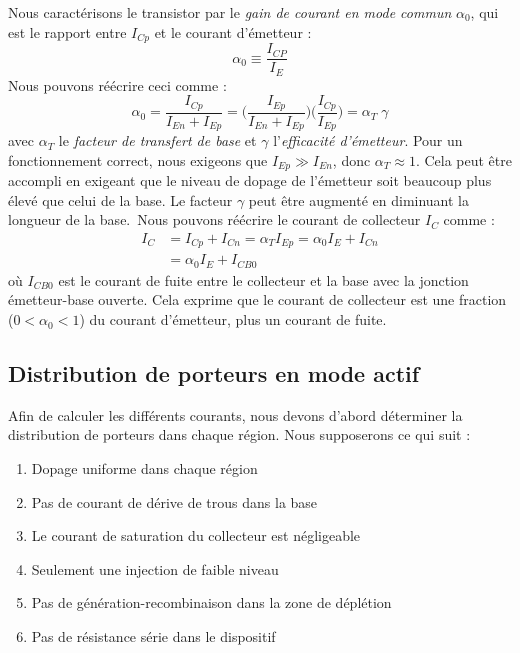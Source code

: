 Nous caractérisons le transistor par le \emph{gain de courant en mode commun} $\alpha_0$, qui est le rapport entre $I_{Cp}$ et le courant d'émetteur :
$$
\alpha_0 \equiv \frac{I_{CP}}{I_E}
$$
Nous pouvons réécrire ceci comme :
$$
\alpha_0 = \frac{I_{Cp}}{I_{En} + I_{Ep}} = \Big(\frac{I_{Ep}}{I_{En} + I_{Ep}}\Big)  \Big(\frac{I_{Cp}}{I_{Ep}}\Big) = \alpha_T \; \gamma
$$
avec $\alpha_T$ le \emph{facteur de transfert de base} et $\gamma$ l'\emph{efficacité d'émetteur}. Pour un fonctionnement correct, nous exigeons que $I_{Ep} \gg I_{En}$, donc $\alpha_T \approx 1$. Cela peut être accompli en exigeant que le niveau de dopage de l'émetteur soit beaucoup plus élevé que celui de la base. Le facteur $\gamma$ peut être augmenté en diminuant la longueur de la base.\
Nous pouvons réécrire le courant de collecteur $I_C$ comme :
\begin{equation}
	\begin{split}
		I_C &= I_{Cp} + I_{Cn} = \alpha_T I_{Ep} = \alpha_0 I_E + I_{Cn} \\
		&= \alpha_0 I_E + I_{CB0}
	\end{split}
	\label{eq:bjt1}
\end{equation}
où $I_{CB0}$ est le courant de fuite entre le collecteur et la base avec la jonction émetteur-base ouverte. Cela exprime que le courant de collecteur est une fraction ($0 < \alpha_0 < 1$) du courant d'émetteur, plus un courant de fuite.

\subsection{Distribution de porteurs en mode actif}
Afin de calculer les différents courants, nous devons d'abord déterminer la distribution de porteurs dans chaque région. Nous supposerons ce qui suit :
\begin{enumerate}
	\item Dopage uniforme dans chaque région
	\item Pas de courant de dérive de trous dans la base
	\item Le courant de saturation du collecteur est négligeable
	\item Seulement une injection de faible niveau
	\item Pas de génération-recombinaison dans la zone de déplétion
	\item Pas de résistance série dans le dispositif
\end{enumerate}

